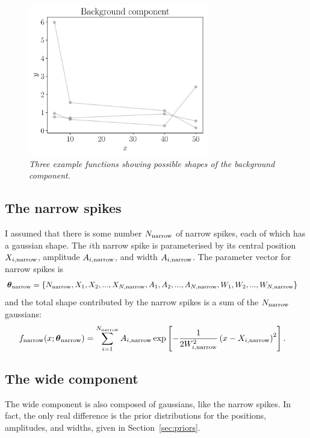 \documentclass[a4paper, 12pt]{article}
\newcommand{\params}{\boldsymbol{\theta}}
\newcommand{\x}{x}
\begin{document}
\begin{figure}
\centering
\includegraphics[width=0.7\textwidth]{figures/background.pdf}
\caption{\it Three example functions showing possible shapes of the
background component.\label{fig:background}}
\end{figure}

\subsection{The narrow spikes}
I assumed that there is some number $N_{\rm narrow}$ of narrow spikes,
each of which has a gaussian shape. The $i$th narrow spike is parameterised
by its central position $X_{i, \rm narrow}$,
amplitude $A_{i, \rm narrow}$, and width $A_{i, \rm narrow}$.
The parameter vector for narrow spikes is
\begin{align}
\params_{\rm narrow} &=
  \{N_{\rm narrow}, X_1, X_2, ..., X_{N, \rm narrow},
    A_1, A_2, ..., A_{N, \rm narrow},
    W_1, W_2, ..., W_{N, \rm narrow}\}
\end{align}
and the total shape contributed by the
narrow spikes is a sum of the $N_{\rm narrow}$ gaussians:
\begin{align}
f_{\rm narrow}(\x; \params_{\rm narrow}) &=
    \sum_{i=1}^{N_{\rm narrow}} A_{i, \rm narrow}
 \exp\left[-\frac{1}{2W_{i, \rm narrow}^2}\left(x - X_{i, \rm narrow}\right)^2\right].
\end{align}

\subsection{The wide component}
The wide component is also composed of gaussians, like the narrow spikes.
In fact, the only real difference is the prior distributions for the positions,
amplitudes, and widths, given in Section~\ref{sec:priors}.
\end{document}
